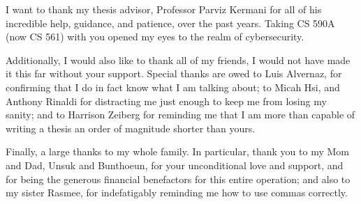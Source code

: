 \providecommand{\heading}[1]{\section{#1}}
\providecommand{\subheading}[1]{\subsection{#1}}

I want to thank my thesis advisor, Professor Parviz Kermani for all of his incredible help, guidance, and patience, over the past years. %
Taking CS 590A (now CS 561) with you opened my eyes to the realm of cybersecurity.

Additionally, I would also like to thank all of my friends, I would not have made it this far without your support. %
Special thanks are owed to Luis Alvernaz, for confirming that I do in fact know what I am talking about; %
to Micah Hsi, and Anthony Rinaldi for distracting me just enough to keep me from losing my sanity; %
and to Harrison Zeiberg for reminding me that I am more than capable of writing a thesis an order of magnitude shorter than yours. 

Finally, a large thanks to my whole family. %
In particular, thank you to my Mom and Dad, Unsuk and Bunthoeun, for your unconditional love and support, and for being the generous financial benefactors for this entire operation; %
and also to my sister Rasmee, for indefatigably reminding me how to use commas correctly.